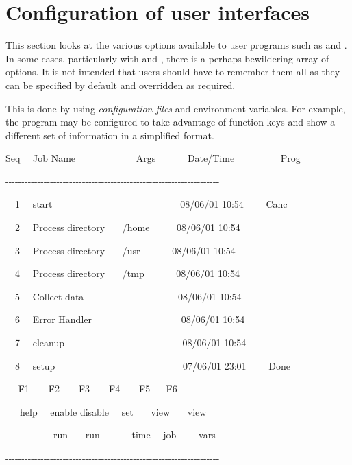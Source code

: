 \chapter{Configuration of user interfaces}
\label{chp:configurability}
\label{bkm:Configurability}This section looks at the various options available to user programs such as \PrBtr{} and \PrBtq{}.
In some cases, particularly with \PrBtr{} and \PrBtjchange{}, there is a perhaps bewildering array of options. It is not intended that
users should have to remember them all as they can be specified by default and overridden as required.

This is done by using \textit{configuration files} and environment variables. For example, the program \PrBtq{} may be configured to take
advantage of function keys and show a different set of information in a simplified format.

\begin{exparasmall}

Seq \ \ Job Name \ \ \ \ \ \ \ \ \ \ \ \ Args \ \ \ \ \ \ Date/Time
\ \ \ \ \ \ \ \ \ Prog

{}-{}-{}-{}-{}-{}-{}-{}-{}-{}-{}-{}-{}-{}-{}-{}-{}-{}-{}-{}-{}-{}-{}-{}-{}-{}-{}-{}-{}-{}-{}-{}-{}-{}-{}-{}-{}-{}-{}-{}-{}-{}-{}-{}-{}-{}-{}-{}-{}-{}-{}-{}-{}-{}-{}-{}-{}-{}-{}-{}-{}-{}-{}-{}-{}-{}-{}-

\ \ 1 \ \ start
\ \ \ \ \ \ \ \ \ \ \ \ \ \ \ \ \ \ \ \ \ \ \ \ \ \ 08/06/01 10:54
\ \ \ \ Canc

\ \ 2 \ \ Process directory \ \ \ /home \ \ \ \ \ 08/06/01 10:54

\ \ 3 \ \ Process directory \ \ \ /usr \ \ \ \ \ \ 08/06/01 10:54

\ \ 4 \ \ Process directory \ \ \ /tmp \ \ \ \ \ \ 08/06/01 10:54

\ \ 5 \ \ Collect data \ \ \ \ \ \ \ \ \ \ \ \ \ \ \ \ \ \ \ 08/06/01
10:54

\ \ 6 \ \ Error Handler \ \ \ \ \ \ \ \ \ \ \ \ \ \ \ \ \ \ 08/06/01
10:54

\ \ 7 \ \ cleanup
\ \ \ \ \ \ \ \ \ \ \ \ \ \ \ \ \ \ \ \ \ \ \ \ 08/06/01 10:54

\ \ 8 \ \ setup
\ \ \ \ \ \ \ \ \ \ \ \ \ \ \ \ \ \ \ \ \ \ \ \ \ \ 07/06/01 23:01
\ \ \ \ Done

\bigskip


{}-{}-{}-{}-F1-{}-{}-{}-{}-{}-F2-{}-{}-{}-{}-{}-F3-{}-{}-{}-{}-{}-F4-{}-{}-{}-{}-{}-F5-{}-{}-{}-{}-F6-{}-{}-{}-{}-{}-{}-{}-{}-{}-{}-{}-{}-{}-{}-{}-{}-{}-{}-{}-{}-{}-

\ \ \ help \ \ enable disable \ \ set \ \ \ view \ \ \ view

\ \ \ \ \ \ \ \ \ \ run \ \ \ run \ \ \ \ \ \ time \ \ job \ \ \ \ vars

{}-{}-{}-{}-{}-{}-{}-{}-{}-{}-{}-{}-{}-{}-{}-{}-{}-{}-{}-{}-{}-{}-{}-{}-{}-{}-{}-{}-{}-{}-{}-{}-{}-{}-{}-{}-{}-{}-{}-{}-{}-{}-{}-{}-{}-{}-{}-{}-{}-{}-{}-{}-{}-{}-{}-{}-{}-{}-{}-{}-{}-{}-{}-{}-{}-{}-{}-

\end{exparasmall}

